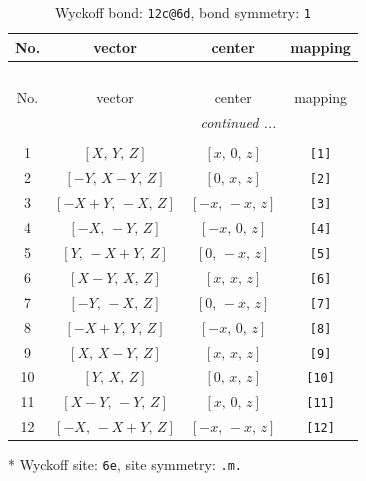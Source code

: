 \documentclass[fleqn,8pt]{jsarticle}
\begin{document}
\begin{longtable}{cccc}
\caption{Wyckoff bond: {\tt 12c@6d}, bond symmetry: {\tt 1}}
 \\
 \hline \hline
No. & vector & center & mapping \\ \hline \endfirsthead

\multicolumn{3}{l}{\tablename\ \thetable{}} \\
 \hline \hline
No. & vector & center & mapping \\ \hline \endhead

 \hline \hline
\multicolumn{3}{r}{\footnotesize\it continued ...} \\ \endfoot

 \hline \hline
\multicolumn{3}{r}{} \\ \endlastfoot

1 & $\left[ X,\, Y,\, Z \right]$ & $\left[ x,\, 0,\, z \right]$ & {\tt [1]} \\ \hline
2 & $\left[ - Y,\, X - Y,\, Z \right]$ & $\left[ 0,\, x,\, z \right]$ & {\tt [2]} \\ \hline
3 & $\left[ - X + Y,\, - X,\, Z \right]$ & $\left[ - x,\, - x,\, z \right]$ & {\tt [3]} \\ \hline
4 & $\left[ - X,\, - Y,\, Z \right]$ & $\left[ - x,\, 0,\, z \right]$ & {\tt [4]} \\ \hline
5 & $\left[ Y,\, - X + Y,\, Z \right]$ & $\left[ 0,\, - x,\, z \right]$ & {\tt [5]} \\ \hline
6 & $\left[ X - Y,\, X,\, Z \right]$ & $\left[ x,\, x,\, z \right]$ & {\tt [6]} \\ \hline
7 & $\left[ - Y,\, - X,\, Z \right]$ & $\left[ 0,\, - x,\, z \right]$ & {\tt [7]} \\ \hline
8 & $\left[ - X + Y,\, Y,\, Z \right]$ & $\left[ - x,\, 0,\, z \right]$ & {\tt [8]} \\ \hline
9 & $\left[ X,\, X - Y,\, Z \right]$ & $\left[ x,\, x,\, z \right]$ & {\tt [9]} \\ \hline
10 & $\left[ Y,\, X,\, Z \right]$ & $\left[ 0,\, x,\, z \right]$ & {\tt [10]} \\ \hline
11 & $\left[ X - Y,\, - Y,\, Z \right]$ & $\left[ x,\, 0,\, z \right]$ & {\tt [11]} \\ \hline
12 & $\left[ - X,\, - X + Y,\, Z \right]$ & $\left[ - x,\, - x,\, z \right]$ & {\tt [12]} \\
\end{longtable}
* Wyckoff site: {\tt 6e}, site symmetry: {\tt .m.}
\renewcommand{\arraystretch}{1.2}
\end{document}
